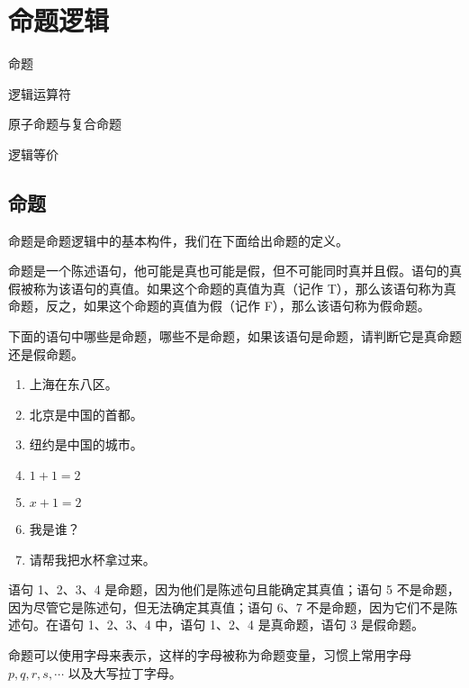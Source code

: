 \section{命题逻辑}
\begin{introduction}
    \item 命题
    \item 逻辑运算符
    \item 原子命题与复合命题
    \item 逻辑等价
\end{introduction}

\subsection{命题}
命题是命题逻辑中的基本构件，我们在下面给出命题的定义。
\begin{definition}[命题的定义]\label{def:命题的定义}
    命题是一个陈述语句，他可能是真也可能是假，但不可能同时真并且假。语句的真假被称为该语句的真值。如果这个命题的真值为真（记作 T），那么该语句称为真命题，反之，如果这个命题的真值为假（记作 F），那么该语句称为假命题。
\end{definition}

\begin{collections}
    \begin{example}
        下面的语句中哪些是命题，哪些不是命题，如果该语句是命题，请判断它是真命题还是假命题。
        \begin{enumerate}
            \item 上海在东八区。
            \item 北京是中国的首都。
            \item 纽约是中国的城市。
            \item $1 + 1 = 2$
            \item $x + 1 = 2$
            \item 我是谁？
            \item 请帮我把水杯拿过来。
        \end{enumerate}
    \end{example}
    \begin{solution}
        语句 1、2、3、4 是命题，因为他们是陈述句且能确定其真值；语句 5 不是命题，因为尽管它是陈述句，但无法确定其真值；语句 6、7 不是命题，因为它们不是陈述句。在语句 1、2、3、4 中，语句 1、2、4 是真命题，语句 3 是假命题。
    \end{solution}
\end{collections}

命题可以使用字母来表示，这样的字母被称为命题变量，习惯上常用字母 $p, q, r, s, \cdots$ 以及大写拉丁字母。

